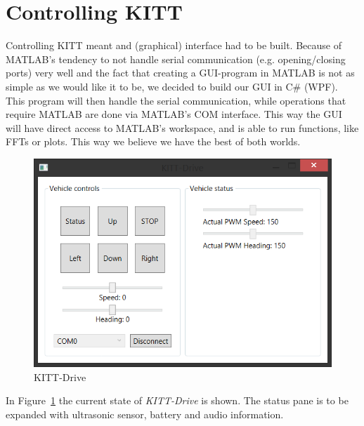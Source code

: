 \documentclass[11pt,titlepage]{report}
\begin{document}
\section{Controlling KITT}
Controlling KITT meant and (graphical) interface had to be built. Because of MATLAB's tendency to not handle serial communication (e.g. opening/closing ports) very well and the fact that creating a GUI-program in MATLAB is not as simple as we would like it to be, we decided to build our GUI in C\# (WPF). This program will then handle the serial communication, while operations that require MATLAB are done via MATLAB's COM interface. This way the GUI will have direct access to MATLAB's workspace, and is able to run functions, like FFTs or plots. This way we believe we have the best of both worlds.

\begin{figure}[H]
	\centering
	\includegraphics[width=0.8\linewidth]{resource/KITT-Drive.png}
	\caption{KITT-Drive}
	\label{fig:ass1-kitt-drive}
\end{figure}

In Figure~\ref{fig:ass1-kitt-drive} the current state of \textit{KITT-Drive} is shown. The status pane is to be expanded with ultrasonic sensor, battery and audio information.
\end{document}
